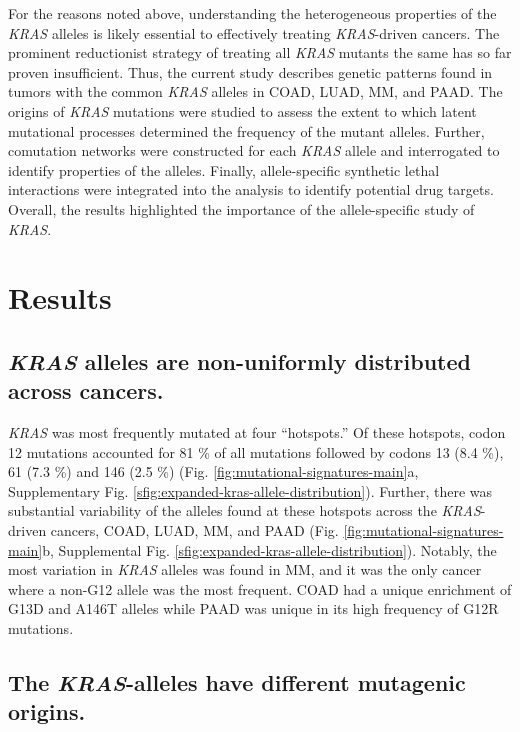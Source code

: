 \documentclass[english, 12pt, letterpaper]{article}
\newcommand{\KRAS}{\emph{KRAS}}
\begin{document}
For the reasons noted above, understanding the heterogeneous properties of the \KRAS{} alleles is likely essential to effectively treating \KRAS{}-driven cancers.
The prominent reductionist strategy of treating all \KRAS{} mutants the same has so far proven insufficient.
Thus, the current study describes genetic patterns found in tumors with the common \KRAS{} alleles in COAD, LUAD, MM, and PAAD.
The origins of \KRAS{} mutations were studied to assess the extent to which latent mutational processes determined the frequency of the mutant alleles.
Further, comutation networks were constructed for each \KRAS{} allele and interrogated to identify properties of the alleles.
Finally, allele-specific synthetic lethal interactions were integrated into the analysis to identify potential drug targets.
Overall, the results highlighted the importance of the allele-specific study of \KRAS{}.

\section*{Results}

\subsection*{\KRAS{} alleles are non-uniformly distributed across cancers.}


\KRAS{} was most frequently mutated at four “hotspots.” 
Of these hotspots, codon 12 mutations accounted for 81 \% of all mutations followed by codons 13 (8.4 \%), 61 (7.3 \%) and 146 (2.5 \%) (Fig. \ref{fig:mutational-signatures-main}a, Supplementary Fig. \ref{sfig:expanded-kras-allele-distribution}). 
Further, there was substantial variability of the alleles found at these hotspots across the \KRAS{}-driven cancers, COAD, LUAD, MM, and PAAD (Fig. \ref{fig:mutational-signatures-main}b, Supplemental Fig. \ref{sfig:expanded-kras-allele-distribution}). 
Notably, the most variation in \KRAS{} alleles was found in MM, and it was the only cancer where a non-G12 allele was the most frequent. 
COAD had a unique enrichment of G13D and A146T alleles while PAAD was unique in its high frequency of G12R mutations.


\subsection*{The \KRAS{}-alleles have different mutagenic origins.}
\end{document}
